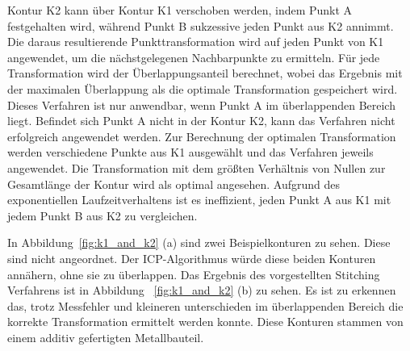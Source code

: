 Kontur K2 kann über Kontur K1 verschoben werden, indem Punkt A festgehalten wird, 
während Punkt B sukzessive jeden Punkt aus K2 annimmt. 
Die daraus resultierende Punkttransformation wird auf jeden Punkt von K1 angewendet, 
um die nächstgelegenen Nachbarpunkte zu ermitteln. Für jede Transformation wird der 
Überlappungsanteil berechnet, wobei das Ergebnis mit der maximalen Überlappung
als die optimale Transformation gespeichert wird.
Dieses Verfahren ist nur anwendbar, wenn Punkt A im überlappenden Bereich liegt. 
Befindet sich Punkt A nicht in der Kontur K2, 
kann das Verfahren nicht erfolgreich angewendet werden.
Zur Berechnung der optimalen Transformation werden verschiedene Punkte aus K1 
ausgewählt und das Verfahren jeweils angewendet. 
Die Transformation mit dem größten Verhältnis von Nullen zur
Gesamtlänge der Kontur wird als optimal angesehen. 
Aufgrund des exponentiellen Laufzeitverhaltens ist es ineffizient, 
jeden Punkt A aus K1 mit jedem Punkt B aus K2 zu vergleichen.

In Abbildung~\ref{fig:k1_and_k2} (a) sind zwei Beispielkonturen zu sehen. 
Diese sind nicht angeordnet. Der ICP-Algorithmus würde diese beiden Konturen 
annähern, ohne sie zu überlappen. 
Das Ergebnis des vorgestellten Stitching Verfahrens ist in Abbildung 
~\ref{fig:k1_and_k2} (b) zu sehen. Es ist zu erkennen das, trotz Messfehler und 
kleineren unterschieden im überlappenden Bereich die korrekte Transformation 
ermittelt werden konnte. Diese Konturen stammen von einem additiv gefertigten 
Metallbauteil.

